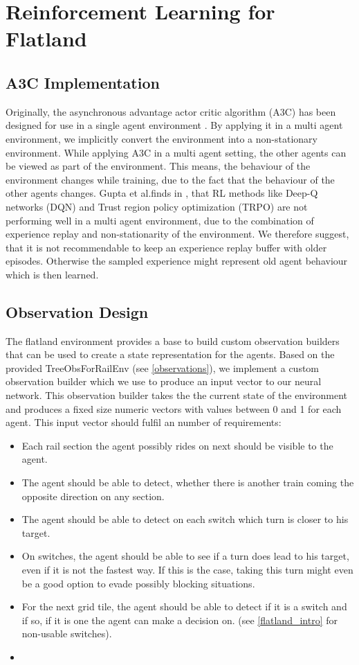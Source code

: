\section{Reinforcement Learning for Flatland}
\subsection*{A3C Implementation}\label{enhanced_observations}
Originally, the asynchronous advantage actor critic algorithm (A3C) has been designed for use in a single agent environment \cite{a3c}.
By applying it in a multi agent environment, we implicitly convert the environment into a non-stationary environment.
While applying A3C in a multi agent setting, the other agents can be viewed as part of the environment. This means, the behaviour of the environment changes while training, due to the fact that the behaviour of the other agents changes.
Gupta et al.finds in \cite{multiagent_comp_a3c_dqn_etc}, that RL methods like Deep-Q networks (DQN) and Trust region policy optimization (TRPO) are not performing well in a multi agent environment, due to the combination of experience replay and non-stationarity of the environment. We therefore suggest, that it is not recommendable to keep an experience replay buffer with older episodes. Otherwise the sampled experience might represent old agent behaviour which is then learned.

\subsection*{Observation Design}\label{enhanced_observations}
The flatland environment provides a base to build custom observation builders that can be used to create a state representation for the agents. Based on the provided TreeObsForRailEnv (see \autoref{observations}), we implement a custom observation builder which we use to produce an input vector to our neural network. This observation builder takes the the current state of the environment and produces a fixed size numeric vectors with values between 0 and 1 for each agent. This input vector should fulfil an number of requirements:
\begin{itemize}
	\item Each rail section the agent possibly rides on next should be visible to the agent.
	\item The agent should be able to detect, whether there is another train coming the opposite direction on any section.
	\item The agent should be able to detect on each switch which turn is closer to his target.
	\item On switches, the agent should be able to see if a turn does lead to his target, even if it is not the fastest way. If this is the case, taking this turn might even be a good option to evade possibly blocking situations.
	\item For the next grid tile, the agent should be able to detect if it is a switch and if so, if it is one the agent can make a decision on. (see \autoref{flatland_intro} for non-usable switches).
	\item 
\end{itemize}

